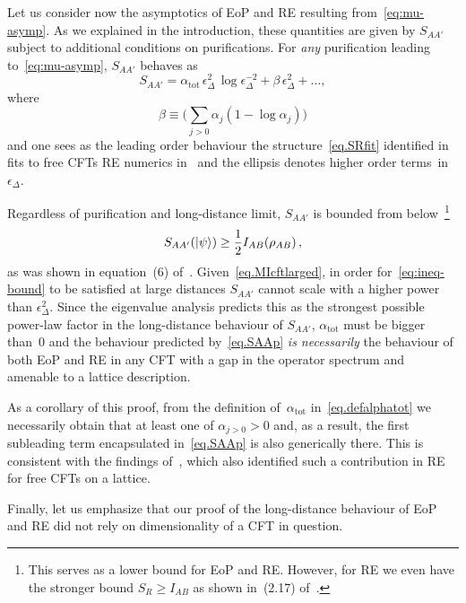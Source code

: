 \documentclass[prl,a4paper,notitlepage,twocolumn,superscriptaddress,longbibliography,reprint]{revtex4-2}
\begin{document}
Let us consider now the asymptotics of EoP and RE resulting from~\eqref{eq:mu-asymp}. As we explained in the introduction, these quantities are given by $S_{AA'}$ subject to additional conditions on purifications. For \emph{any} purification leading to~\eqref{eq:mu-asymp}, $S_{AA'}$ behaves as
\begin{equation}
\label{eq.SAAp}
S_{AA'} = \alpha_{\mathrm{tot}} \, \epsilon_{\Delta}^2 \, \log{\epsilon_{\Delta}^{-2}}+\beta \, \epsilon_{\Delta}^{2} + \ldots,
\end{equation}
where
\begin{equation}
\beta \equiv \Big( \sum_{j>0}\alpha_j(1-\log{\alpha_j}) \Big)
\end{equation}
and one sees as the leading order behaviour the structure~\eqref{eq.SRfit} identified in fits to free CFTs RE numerics in~\cite{Bueno:2020vnx,Bueno:2020fle} and the ellipsis denotes higher order terms~in~$\epsilon_{\Delta}$. 

Regardless of purification and long-distance limit, $S_{AA'}$ is bounded from below~\footnote{This serves as a lower bound for EoP and RE. However, for RE we even have the stronger bound $S_R\geq I_{AB}$ as shown in~(2.17) of~\cite{Dutta:2019gen}.}
\begin{align}
    S_{AA'}(\ket{\psi})\geq \frac{1}{2}I_{AB}(\rho_{AB})\,,\label{eq:ineq-bound}
\end{align}
as was shown in equation~(6) of~\cite{bagchi2015monogamy}. Given~\eqref{eq.MIcftlarged}, in order for~\eqref{eq:ineq-bound} to be satisfied at large distances $S_{AA'}$ cannot scale with a higher power than $\epsilon_{\Delta}^2$. Since the eigenvalue analysis predicts this as the strongest possible power-law factor in the long-distance behaviour of $S_{AA'}$, $\alpha_{\mathrm{tot}}$ must be bigger than~$0$ and the behaviour predicted by~\eqref{eq.SAAp} \emph{is necessarily} the behaviour of both EoP and RE in any CFT with a gap in the operator spectrum and amenable to a lattice description.

As a corollary of this proof, from the definition of~$\alpha_{\mathrm{tot}}$ in~\eqref{eq.defalphatot} we necessarily obtain that at least one of $\alpha_{j>0} > 0$ and, as a result, the first subleading term encapsulated in~\eqref{eq.SAAp} is also generically there. This is consistent with the findings of~\cite{Bueno:2020vnx,Bueno:2020fle}, which also identified such a contribution in RE for free CFTs on a lattice.

Finally, let us emphasize that our proof of the long-distance behaviour of EoP and RE did not rely on dimensionality of a CFT in question.
\end{document}
